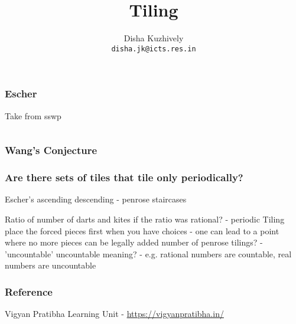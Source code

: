 \documentclass{beamer}
\title{Tiling}
\author[dishajk]{Disha Kuzhively\\ \texttt{disha.jk@icts.res.in}}
\institute{International Centre for Theoretical Sciences - TIFR, Bangalore}
\begin{document}
\begin{frame}
    \titlepage
\end{frame}
\begin{frame}
    \frametitle{Escher}
    Take from sswp
    \begin{columns}
        \begin{column}{0.45\textwidth}    
        \end{column}
        \begin{column}{0.45\textwidth}    
        \end{column}
    \end{columns}
\end{frame}
\begin{frame}
\frametitle{Wang's Conjecture}
\end{frame}
\begin{frame}
    \frametitle{Are there sets of tiles that tile only periodically?}
\end{frame}
\begin{frame}
Escher's ascending descending - penrose staircases
\end{frame}
\begin{frame}
Ratio of number of darts and kites
if the ratio was rational? - periodic Tiling
place the forced pieces first
when you have choices - one can lead to a point where no more pieces can be legally added
number of penrose tilings? - 'uncountable'
uncountable meaning? - e.g. rational numbers are countable, real numbers are uncountable

\end{frame}

\begin{frame}
\frametitle{Reference}
Vigyan Pratibha Learning Unit - \url{https://vigyanpratibha.in/}
\end{frame}
\end{document}
